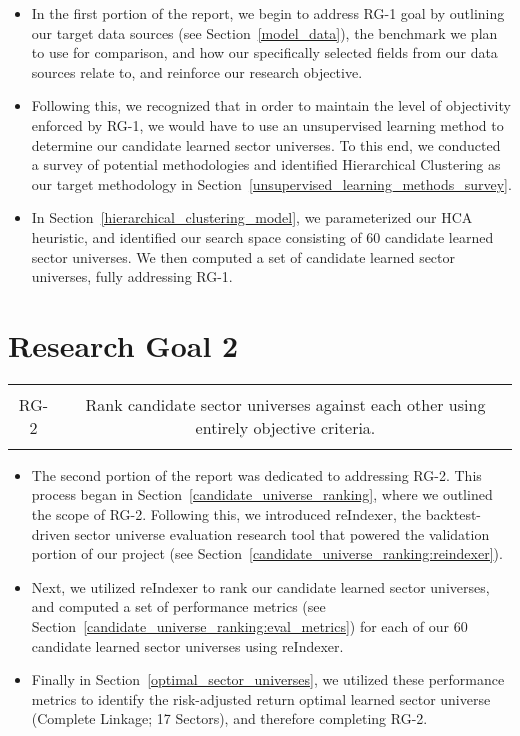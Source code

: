 \documentclass[../main.tex]{subfiles}
\begin{document}
\begin{itemize}
    \item In the first portion of the report, we begin to address RG-1 goal by outlining our target data sources (see Section~\ref{model_data}), the benchmark we plan to use for comparison, and how our specifically selected fields from our data sources relate to, and reinforce our research objective.
    \item Following this, we recognized that in order to maintain the level of objectivity enforced by RG-1, we would have to use an unsupervised learning method to determine our candidate learned sector universes. To this end, we conducted a survey of potential methodologies and identified Hierarchical Clustering as our target methodology in Section~\ref{unsupervised_learning_methods_survey}.
    \item In Section~\ref{hierarchical_clustering_model}, we parameterized our HCA heuristic, and identified our search space consisting of 60 candidate learned sector universes. We then computed a set of candidate learned sector universes, fully addressing RG-1.
\end{itemize}


\section{Research Goal 2}

\begin{table}[h!]
    \centering
    \begin{tabular}{| c | c |}
        \hline
        &  \\
        RG-2 & Rank candidate sector universes against each other using entirely objective criteria. \\
        & \\
        \hline
    \end{tabular}
\end{table}

\begin{itemize}
    \item The second portion of the report was dedicated to addressing RG-2. This process began in Section~\ref{candidate_universe_ranking}, where we outlined the scope of RG-2. Following this, we introduced reIndexer, the backtest-driven sector universe evaluation research tool that powered the validation portion of our project (see Section~\ref{candidate_universe_ranking:reindexer}).
    \item Next, we utilized reIndexer to rank our candidate learned sector universes, and computed a set of performance metrics (see Section~\ref{candidate_universe_ranking:eval_metrics}) for each of our 60 candidate learned sector universes using reIndexer.
    \item Finally in Section~\ref{optimal_sector_universes}, we utilized these performance metrics to identify the risk-adjusted return optimal learned sector universe (Complete Linkage; 17 Sectors), and therefore completing RG-2.
\end{itemize}
\end{document}
